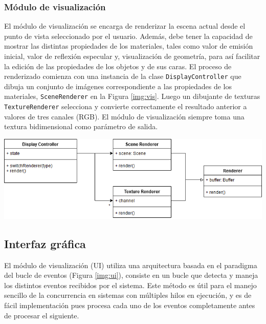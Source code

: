 \subsubsection{Módulo de visualización}

El módulo de visualización se encarga de renderizar la escena actual desde el punto de vista seleccionado por el usuario. Además, debe tener la capacidad de mostrar las distintas propiedades de los materiales, tales como valor de emisión inicial, valor de reflexión especular y, visualización de geometría, para así facilitar la edición de las propiedades de los objetos y de sus caras. El proceso de renderizado comienza con una instancia de la clase \verb|DisplayController| que dibuja un conjunto de imágenes correspondiente a las propiedades de los materiales, \verb|SceneRenderer| en la Figura \ref{img:vis}. Luego un dibujante de texturas \verb|TextureRenderer| selecciona y convierte correctamente el resultado anterior a valores de tres canales (RGB). El módulo de visualización siempre toma una textura bidimensional como parámetro de salida.

\vspace{5mm}
\begin{minipage}[h]{0.8\linewidth}
	\centering
	\includegraphics[width=\linewidth]{assets/display}
	\label{img:vis}
\end{minipage}

\subsection{Interfaz gráfica}

El módulo de visualización (UI) utiliza una arquitectura basada en el paradigma del bucle de eventos (Figura \ref{img:ui}), consiste en un bucle que detecta y maneja los distintos eventos recibidos por el sistema. Este método es útil para el manejo sencillo de la concurrencia en sistemas con múltiples hilos en ejecución, y es de fácil implementación pues procesa cada uno de los eventos completamente antes de procesar el siguiente.

